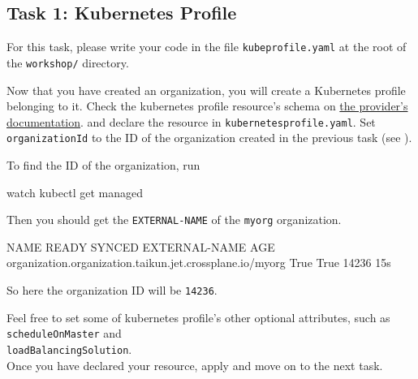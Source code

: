 \subsection{Task 1: Kubernetes Profile}\label{sec:kubeprofile}

\begin{note}
For this task, please write your code in the file \texttt{kubeprofile.yaml}
at the root of the \texttt{workshop/} directory.
\end{note}

Now that you have created an organization,
you will create a Kubernetes profile belonging to it.
Check the kubernetes profile resource's schema on
\href{https://doc.crds.dev/github.com/itera-io/provider-jet-taikun/kubernetesprofile.taikun.jet.crossplane.io/Profile/v1alpha1}{the provider's documentation}.
and declare the resource in \texttt{kubernetesprofile.yaml}.
Set \texttt{organizationId} to the ID
of the organization created in the previous task (see ).\\


\begin{tip}
To find the ID of the organization, run
\begin{shell}
watch kubectl get managed
\end{shell}
Then you should get the \texttt{EXTERNAL-NAME} of the \texttt{myorg} organization.
\begin{raw}
NAME                                                      READY SYNCED EXTERNAL-NAME AGE
organization.organization.taikun.jet.crossplane.io/myorg  True  True   14236         15s
\end{raw}
So here the organization ID will be \texttt{14236}.
\end{tip}

Feel free to set some of kubernetes profile's other optional attributes,
such as \texttt{scheduleOnMaster} and \\ \texttt{loadBalancingSolution}.
\\

Once you have declared your resource, apply and move on to the next task.
